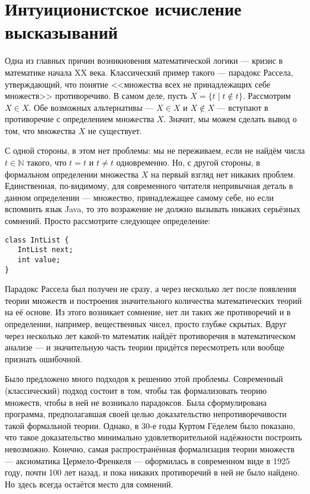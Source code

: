\section{Интуиционистское исчисление высказываний}

Одна из главных причин возникновения математической логики --- кризис в математике
начала XX века. Классический пример такого --- парадокс Рассела, утверждающий,
что понятие <<множества всех не принадлежащих себе множеств>> противоречиво.
В самом деле, пусть $X = \{ t \mid t \notin t \}$. Рассмотрим $X \in X$.
Обе возможных альтернативы --- $X \in X$ и $X \notin X$ --- вступают в противоречие с 
определением множества $X$. Значит, мы можем сделать вывод о том, что множества $X$ не существует.

С одной стороны, в этом нет проблемы: мы не переживаем, если не найдём числа $t \in \mathbb{N}$ 
такого, что $t=t$ и $t \ne t$ одновременно. Но, с другой стороны, в формальном определении
множества $X$ на первый взгляд нет никаких проблем. Единственная, по-видимому, для современного
читателя непривычная деталь в данном определении --- множество, принадлежащее самому себе, но 
если вспомнить язык Java, то это возражение не должно вызывать никаких серьёзных сомнений.
Просто рассмотрите следующее определение:

\begin{verbatim}
class IntList {
   IntList next;
   int value;
}
\end{verbatim}

Парадокс Рассела был получен не сразу,
а через несколько лет после появления теории множеств и построения значительного количества
математических теорий на её основе. Из этого возникает сомнение, нет ли таких 
же противоречий и в определении, например, вещественных чисел, просто глубже скрытых.
Вдруг через несколько лет какой-то математик найдёт противоречия в математическом анализе --- 
и значительную часть теории придётся пересмотреть или вообще признать ошибочной.

Было предложено много подходов к решению этой проблемы. Современный (классический) подход 
состоит в том, чтобы так формализовать теорию множеств, чтобы в ней не возникало парадоксов.
Была сформулирована программа, предполагавшая своей целью доказательство непротиворечивости
такой формальной теории. Однако, в 30-е годы Куртом Гёделем было показано, что такое 
доказательство минимально удовлетворительной надёжности построить невозможно. Конечно,
самая распространённая формализация теории множеств --- аксиоматика Цермело-Френкеля ---
оформилась в современном виде в 1925 году, почти 100 лет назад, и пока никаких противоречий
в ней не было найдено. Но здесь всегда остаётся место для сомнений.

